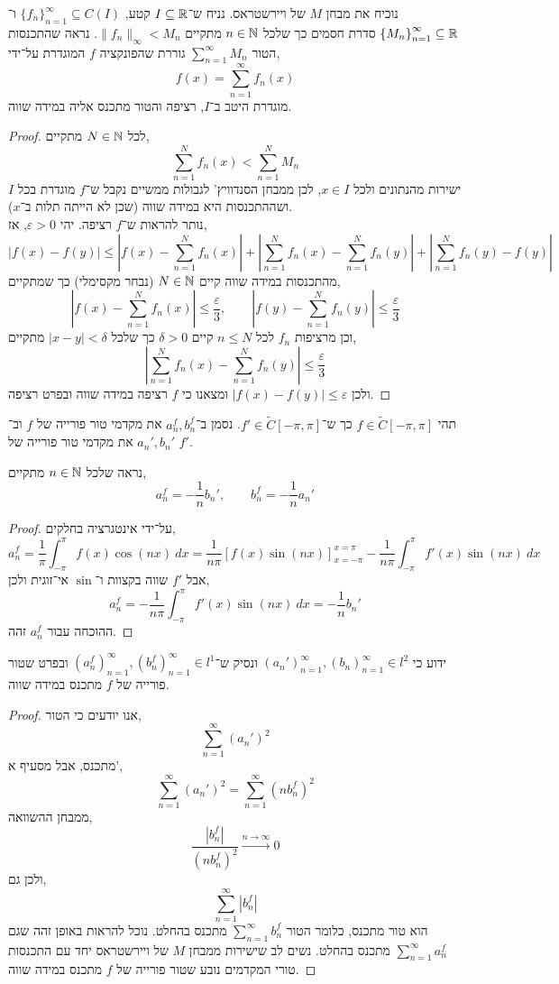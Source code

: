 \question{}
נוכיח את מבחן $M$ של ויירשטראס.
נניח ש־$I \subseteq \mathbb{R}$ קטע, ${\{ f_n \}}_{n = 1}^\infty \subseteq C(I)$ ו־${\{ M_n \}}_{n = 1}^\infty \subseteq \mathbb{R}$ סדרת חסמים כך שלכל $n \in \mathbb{N}$ מתקיים $\lVert f_n \rVert_\infty < M_n$.
נראה שהתכנסות הטור $\sum_{n = 1}^\infty M_n$ גוררת שהפונקציה $f$ המוגדרת על־ידי,
\[
	f(x)
	= \sum_{n = 1}^\infty f_n(x)
\]
מוגדרת היטב ב־$I$, רציפה והטור מתכנס אליה במידה שווה.
\begin{proof}
	לכל $N \in \mathbb{N}$ מתקיים,
	\[
		\sum_{n = 1}^N f_n(x)
		< \sum_{n = 1}^N M_n
	\]
	ישירות מהנתונים ולכל $x \in I$, לכן ממבחן הסנדוויץ' לגבולות ממשיים נקבל ש־$f$ מוגדרת בכל $I$ ושההתכנסות היא במידה שווה (שכן לא הייתה תלות ב־$x$). \\
	נותר להראות ש־$f$ רציפה.
	יהי $\varepsilon > 0$, אז,
	\[
		|f(x) - f(y)|
		\le \left\lvert f(x) - \sum_{n = 1}^N f_n(x) \right\rvert + \left\lvert \sum_{n = 1}^N f_n(x) - \sum_{n = 1}^N f_n(y) \right\rvert + \left\lvert \sum_{n = 1}^N f_n(y) - f(y) \right\rvert
	\]
	מהתכנסות במידה שווה קיים $N \in \mathbb{N}$ (נבחר מקסימלי) כך שמתקיים,
	\[
		\left\lvert f(x) - \sum_{n = 1}^N f_n(x) \right\rvert
		\le \frac{\varepsilon}{3},
		\qquad
		\left\lvert f(y) - \sum_{n = 1}^N f_n(y) \right\rvert
		\le \frac{\varepsilon}{3}
	\]
	וכן מרציפות $f_n$ לכל $n \le N$ קיים $\delta > 0$ כך שלכל $|x - y| < \delta$ מתקיים,
	\[
		\left\lvert \sum_{n = 1}^N f_n(x) - \sum_{n = 1}^N f_n(y) \right\rvert
		\le \frac{\varepsilon}{3}
	\]
	ולכן $|f(x) - f(y)| \le \varepsilon$ ומצאנו כי $f$ רציפה במידה שווה ובפרט רציפה.
\end{proof}

\question{}
תהי $f \in \tilde{C}[-\pi, \pi]$ כך ש־$f' \in \tilde{C}[-\pi, \pi]$.
נסמן ב־$a_n^f, b_n^f$ את מקדמי טור פורייה של $f$ וב־$a_n', b_n'$ את מקדמי טור פורייה של $f'$.

\subquestion{}
נראה שלכל $n \in \mathbb{N}$ מתקיים,
\[
	a_n^f
	= - \frac{1}{n} b_n',
	\qquad
	b_n^f
	= - \frac{1}{n} a_n'
\]
\begin{proof}
	על־ידי אינטגרציה בחלקים,
	\[
		a_n^f
		= \frac{1}{\pi} \int_{-\pi}^{\pi} f(x) \cos(nx)\ dx
		= \frac{1}{n \pi} {\left[ f(x) \sin(nx) \right]}_{x = -\pi}^{x = \pi} - \frac{1}{n \pi} \int_{-\pi}^{\pi} f'(x) \sin(nx)\ dx
	\]
	אבל $f'$ שווה בקצוות ו־$\sin$ אי־זוגית ולכן,
	\[
		a_n^f
		= - \frac{1}{n \pi} \int_{-\pi}^{\pi} f'(x) \sin(nx)\ dx
		= - \frac{1}{n} b_n'
	\]
	ההוכחה עבור $a_n^f$ זהה.
\end{proof}

\subquestion{}
ידוע כי ${( a_n' )}_{n = 1}^\infty, {( b_n )}_{n = 1}^\infty \in l^2$ ונסיק ש־${( a_n^f )}_{n = 1}^\infty, {( b_n^f )}_{n = 1}^\infty \in l^1$ ובפרט שטור פורייה של $f$ מתכנס במידה שווה.
\begin{proof}
	אנו יודעים כי הטור,
	\[
		\sum_{n = 1}^\infty {(a_n')}^2
	\]
	מתכנס, אבל מסעיף א',
	\[
		\sum_{n = 1}^\infty {(a_n')}^2
		= \sum_{n = 1}^\infty {(n b_n^f)}^2
	\]
	ממבחן ההשוואה,
	\[
		\frac{|b_n^f|}{{(n b_n^f)}^2}
		\xrightarrow{n \to \infty} 0
	\]
	ולכן גם,
	\[
		\sum_{n = 1}^\infty | b_n^f |
	\]
	הוא טור מתכנס, כלומר הטור $\sum_{n = 1}^\infty b_n^f$ מתכנס בהחלט.
	נוכל להראות באופן זהה שגם $\sum_{n = 1}^\infty a_n^f$ מתכנס בהחלט.
	נשים לב שישירות ממבחן $M$ של ויירשטראס יחד עם התכנסות טורי המקדמים נובע שטור פורייה של $f$ מתכנס במידה שווה.
\end{proof}

